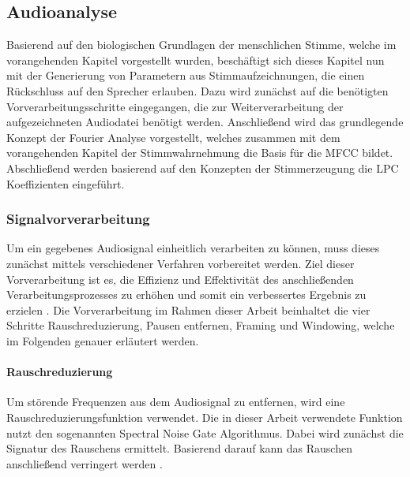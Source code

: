 \subsection{Audioanalyse}\label{sec:Audioanalyse}

\textauthor{\vJB,}{\vHS}{}

Basierend auf den biologischen Grundlagen der menschlichen Stimme, welche im vorangehenden Kapitel vorgestellt wurden, beschäftigt sich dieses Kapitel nun mit der Generierung von Parametern aus Stimmaufzeichnungen, die einen Rückschluss auf den Sprecher erlauben.
Dazu wird zunächst auf die benötigten Vorverarbeitungsschritte eingegangen, die zur Weiterverarbeitung der aufgezeichneten Audiodatei benötigt werden.
Anschließend wird das grundlegende Konzept der Fourier Analyse vorgestellt, welches zusammen mit dem vorangehenden Kapitel der Stimmwahrnehmung die Basis für die \ac{MFCC} bildet.
Abschließend werden basierend auf den Konzepten der Stimmerzeugung die \ac{LPC} Koeffizienten eingeführt.

\subsubsection{Signalvorverarbeitung}\label{sec:preprocessing}

\textauthor{\vJB,}{\vHS}{}

Um ein gegebenes Audiosignal einheitlich verarbeiten zu können, muss dieses zunächst mittels verschiedener Verfahren vorbereitet werden.
Ziel dieser Vorverarbeitung ist es, die Effizienz und Effektivität des anschließenden Verarbeitungsprozesses zu erhöhen und somit ein verbessertes Ergebnis zu erzielen \autocite[vgl.][S. 11672]{lokesh_speech_2019}.
Die Vorverarbeitung im Rahmen dieser Arbeit beinhaltet die vier Schritte Rauschreduzierung, Pausen entfernen, Framing und Windowing, welche im Folgenden genauer erläutert werden.

\paragraph{Rauschreduzierung}\label{sec:Rauschreduzierung}

Um störende Frequenzen aus dem Audiosignal zu entfernen, wird eine Rauschreduzierungsfunktion verwendet.
Die in dieser Arbeit verwendete Funktion nutzt den sogenannten Spectral Noise Gate Algorithmus.
Dabei wird zunächst die Signatur des Rauschens ermittelt.
Basierend darauf kann das Rauschen anschließend verringert werden \autocite[vgl.][S. 25]{kiapuchinski_spectral_2012}.

